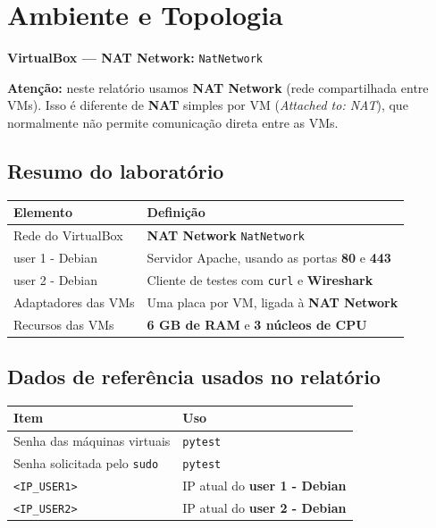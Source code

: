\section{Ambiente e Topologia}

\textbf{VirtualBox --- NAT Network:} \texttt{NatNetwork}

\begin{warnbox}
\textbf{Atenção:} neste relatório usamos \textbf{NAT Network} (rede compartilhada entre VMs). Isso é diferente de \textbf{NAT} simples por VM (\textit{Attached to: NAT}), que normalmente não permite comunicação direta entre as VMs.
\end{warnbox}

\subsection{Resumo do laboratório}

\begin{tabularx}{\linewidth}{lX}
\toprule
\textbf{Elemento} & \textbf{Definição} \\
\midrule
Rede do VirtualBox & \textbf{NAT Network} \texttt{NatNetwork} \\
user 1 - Debian & Servidor Apache, usando as portas \textbf{80} e \textbf{443} \\
user 2 - Debian & Cliente de testes com \texttt{curl} e \textbf{Wireshark} \\
Adaptadores das VMs & Uma placa por VM, ligada à \textbf{NAT Network} \\
Recursos das VMs & \textbf{6 GB de RAM} e \textbf{3 núcleos de CPU} \\
\bottomrule
\end{tabularx}

\subsection{Dados de referência usados no relatório}

\begin{tabularx}{\linewidth}{lX}
\toprule
\textbf{Item} & \textbf{Uso} \\
\midrule
Senha das máquinas virtuais & \texttt{pytest} \\
Senha solicitada pelo \texttt{sudo} & \texttt{pytest} \\
\texttt{<IP\_USER1>} & IP atual do \textbf{user 1 - Debian} \\
\texttt{<IP\_USER2>} & IP atual do \textbf{user 2 - Debian} \\
\bottomrule
\end{tabularx}

